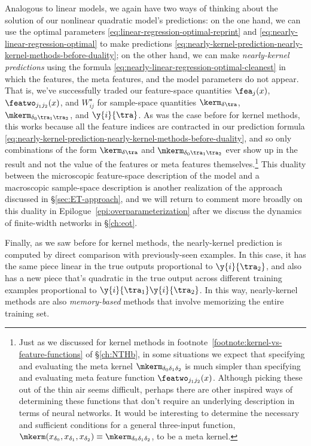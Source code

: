Analogous to linear models, we again have two ways of thinking about the solution of our nonlinear quadratic model's predictions: on the one hand, we can use the optimal parameters \eqref{eq:linear-regression-optimal-reprint} and \eqref{eq:nearly-linear-regression-optimal} to make predictions \eqref{eq:nearly-kernel-prediction-nearly-kernel-methods-before-duality}; 
on the other hand, we can make \emph{nearly-kernel predictions} using the formula \eqref{eq:nearly-linear-regression-optimal-cleanest}  in which the features, the meta features, and the model parameters do not appear. 
That is, we've successfully traded our feature-space quantities $\fea_{j}(x)$, $\featwo_{j_1j_2}(x)$, and $W^{\star}_{ij}$ for sample-space quantities $ \kerm_{\delta\tra}$, $\mkerm_{\delta_0\tra_1\tra_2}$, and $\y{i}{\tra}$. 
As was the case before for kernel methods, this works because all the feature indices are contracted in our prediction formula \eqref{eq:nearly-kernel-prediction-nearly-kernel-methods-before-duality}, and so only combinations of the form $\kerm_{\delta\tra}$ and $\mkerm_{\delta_0\tra_1\tra_2}$ ever show up in the result and not the value of the features or meta features themselves.\footnote{Just as we discussed for kernel methods in footnote~\ref{footnote:kernel-vs-feature-functions} of \S\ref{ch:NTHb}, in some situations we expect that specifying and evaluating the meta kernel $\mkerm_{\delta_0\delta_1\delta_2}$
is much simpler than specifying and evaluating meta feature function $\featwo_{j_1j_2}(x)$.
Although picking these out of the thin air seems difficult, perhaps there are other inspired ways of determining these functions that don't require an underlying description in terms of neural networks.
It would be interesting to determine the necessary and sufficient conditions for a general three-input function, $\mkerm(x_{\delta_0}, x_{\delta_1}, x_{\delta_2}) \equiv \mkerm_{\delta_0\delta_1\delta_2}$, to be a meta kernel.
} 
This duality between the microscopic feature-space description of the model and a macroscopic sample-space description is another realization of the  approach discussed in \S\ref{sec:ET-approach}, and we will return to comment more broadly on this duality in Epilogue~\ref{epi:overparameterization} after we discuss the dynamics of finite-width networks in \S\ref{ch:eot}.

Finally, as we saw before for kernel methods, the nearly-kernel prediction is computed by direct comparison with previously-seen examples. In this case, it has the same piece linear in the true outputs proportional to $\y{i}{\tra_2}$, and also has a new piece that's quadratic in the true output across different training examples proportional to $\y{i}{\tra_1} \y{i}{\tra_2}$. In this way, nearly-kernel methods are also \emph{memory-based} methods that involve memorizing the entire training set.







